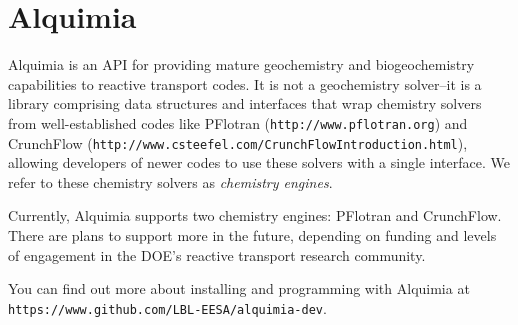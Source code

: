 \section{Alquimia}

Alquimia is an API for providing mature geochemistry and biogeochemistry 
capabilities to reactive transport codes. It is not a geochemistry solver--it is 
a library comprising data structures and interfaces that wrap chemistry solvers 
from well-established codes like PFlotran ({\tt http://www.pflotran.org}) and 
CrunchFlow ({\tt http://www.csteefel.com/CrunchFlowIntroduction.html}), 
allowing developers of newer codes to use these solvers with a single interface. 
We refer to these chemistry solvers as {\em chemistry engines}.

Currently, Alquimia supports two chemistry engines: PFlotran and CrunchFlow. 
There are plans to support more in the future, depending on funding and levels 
of engagement in the DOE's reactive transport research community.

You can find out more about installing and programming with Alquimia at 
{\tt https://www.github.com/LBL-EESA/alquimia-dev}.
